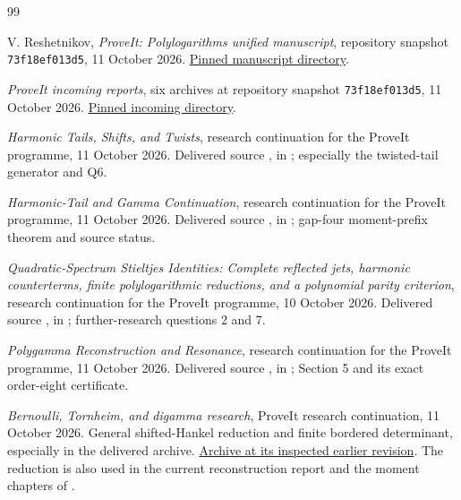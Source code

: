 \documentclass[11pt,a4paper]{article}
\numberwithin{equation}{section}
\theoremstyle{definition}
\theoremstyle{remark}
\newcommand{\shortpin}{\texttt{73f18ef013d5}}
\begin{document}
\clearpage
\begin{thebibliography}{99}

V. Reshetnikov, \emph{ProveIt: Polylogarithms unified manuscript},
repository snapshot \shortpin, 11 October 2026.
\href{https://github.com/VladimirReshetnikov/ProveIt/tree/73f18ef013d5b74eafc883efb2c15210642df12a/Analysis/Polylogarithms/docs/manuscript}{Pinned manuscript directory}.

\emph{ProveIt incoming reports}, six archives at repository snapshot
\shortpin, 11 October 2026.
\href{https://github.com/VladimirReshetnikov/ProveIt/tree/73f18ef013d5b74eafc883efb2c15210642df12a/docs/incoming}{Pinned incoming directory}.

\emph{Harmonic Tails, Shifts, and Twists}, research continuation for the
ProveIt programme, 11 October 2026. Delivered source
,
in \cite{Incoming}; especially the twisted-tail generator and Q6.

\emph{Harmonic-Tail and Gamma Continuation}, research continuation for
the ProveIt programme, 11 October 2026. Delivered source
,
in \cite{Incoming}; gap-four moment-prefix theorem and source status.

\emph{Quadratic-Spectrum Stieltjes Identities: Complete reflected jets,
harmonic counterterms, finite polylogarithmic reductions, and a
polynomial parity criterion}, research continuation for the ProveIt
programme, 10 October 2026. Delivered source
,
in \cite{Incoming}; further-research questions 2 and 7.

\emph{Polygamma Reconstruction and Resonance}, research continuation for
the ProveIt programme, 11 October 2026. Delivered source
,
in \cite{Incoming}; Section 5 and its exact order-eight certificate.

\emph{Bernoulli, Tornheim, and digamma research}, ProveIt research
continuation, 11 October 2026. General shifted-Hankel reduction and
finite bordered determinant, especially
 in the delivered archive.
\href{https://github.com/VladimirReshetnikov/ProveIt/blob/446dca9bd65c20e409d1d2561d4ffad408103e2a/docs/incoming/ProveIt_Bernoulli_Tornheim_Digamma_2026-10-11.zip}{Archive at its inspected earlier revision}.
The reduction is also used in the current reconstruction report
\cite{PRR} and the moment chapters of \cite{ProveIt}.


\end{thebibliography}
\end{document}
